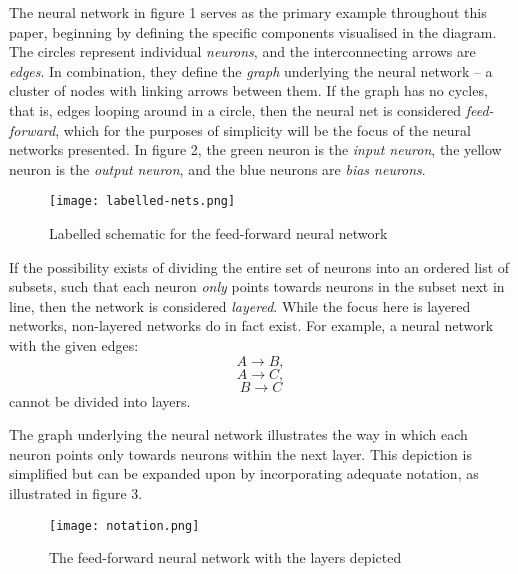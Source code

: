 \documentclass[11pt]{article}
\begin{document}
The neural network in figure 1 serves as the primary example throughout this paper, beginning by defining the specific components visualised in the diagram. The circles represent individual \textit{neurons}, and the interconnecting arrows are \textit{edges}. In combination, they define the \textit{graph} underlying the neural network – a cluster of nodes with linking arrows between them. If the graph has no cycles, that is, edges looping around in a circle, then the neural net is considered \textit{feed-forward}, which for the purposes of simplicity will be the focus of the neural networks presented. In figure 2, the green neuron is the \textit{input neuron}, the yellow neuron is the \textit{output neuron}, and the blue neurons are \textit{bias neurons}.

\begin{figure}[h]
    \centering
    \texttt{[image: labelled-nets.png]}
    \caption{Labelled schematic for the feed-forward neural network}   
\end{figure}

If the possibility exists of dividing the entire set of neurons into an ordered list of subsets, such that each neuron \textit{only} points towards neurons in the subset next in line, then the network is considered \textit{layered}. While the focus here is layered networks, non-layered networks do in fact exist. For example, a neural network with the given edges:
\begin{equation}A \rightarrow B, \nonumber\end{equation}
\begin{equation}A \rightarrow C, \nonumber\end{equation}
\begin{equation}B \rightarrow C \nonumber\end{equation}
cannot be divided into layers.

The graph underlying the neural network illustrates the way in which each neuron points only towards neurons within the next layer. This depiction is simplified but can be expanded upon by incorporating adequate notation, as illustrated in figure 3.

\begin{figure}[h]
    \centering
    \texttt{[image: notation.png]}
    \caption{The feed-forward neural network with the layers depicted}   
\end{figure}
\end{document}
